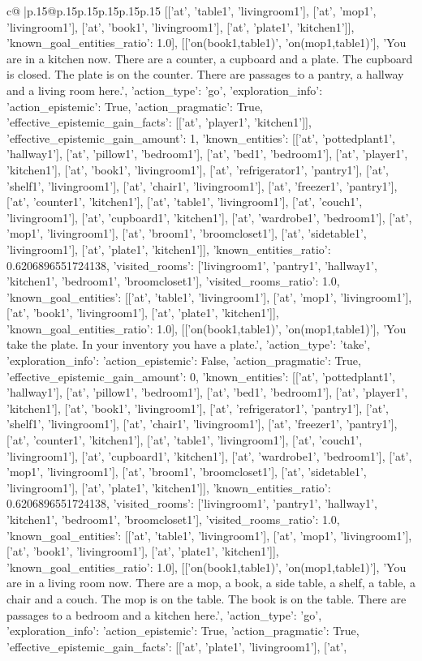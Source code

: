 \documentclass{article}
\begin{document}
{\begin{supertabular}{c@{$\;$}|p{.15\linewidth}@{}p{.15\linewidth}p{.15\linewidth}p{.15\linewidth}p{.15\linewidth}p{.15\linewidth}}
{{{[['at', 'table1', 'livingroom1'], ['at', 'mop1', 'livingroom1'], ['at', 'book1', 'livingroom1'], ['at', 'plate1', 'kitchen1']], 'known_goal_entities_ratio': 1.0}}], [['on(book1,table1)', 'on(mop1,table1)'], 'You are in a kitchen now. There are a counter, a cupboard and a plate. The cupboard is closed. The plate is on the counter. There are passages to a pantry, a hallway and a living room here.', {'action_type': 'go', 'exploration_info': {'action_epistemic': True, 'action_pragmatic': True, 'effective_epistemic_gain_facts': [['at', 'player1', 'kitchen1']], 'effective_epistemic_gain_amount': 1, 'known_entities': [['at', 'pottedplant1', 'hallway1'], ['at', 'pillow1', 'bedroom1'], ['at', 'bed1', 'bedroom1'], ['at', 'player1', 'kitchen1'], ['at', 'book1', 'livingroom1'], ['at', 'refrigerator1', 'pantry1'], ['at', 'shelf1', 'livingroom1'], ['at', 'chair1', 'livingroom1'], ['at', 'freezer1', 'pantry1'], ['at', 'counter1', 'kitchen1'], ['at', 'table1', 'livingroom1'], ['at', 'couch1', 'livingroom1'], ['at', 'cupboard1', 'kitchen1'], ['at', 'wardrobe1', 'bedroom1'], ['at', 'mop1', 'livingroom1'], ['at', 'broom1', 'broomcloset1'], ['at', 'sidetable1', 'livingroom1'], ['at', 'plate1', 'kitchen1']], 'known_entities_ratio': 0.6206896551724138, 'visited_rooms': ['livingroom1', 'pantry1', 'hallway1', 'kitchen1', 'bedroom1', 'broomcloset1'], 'visited_rooms_ratio': 1.0, 'known_goal_entities': [['at', 'table1', 'livingroom1'], ['at', 'mop1', 'livingroom1'], ['at', 'book1', 'livingroom1'], ['at', 'plate1', 'kitchen1']], 'known_goal_entities_ratio': 1.0}}], [['on(book1,table1)', 'on(mop1,table1)'], 'You take the plate. In your inventory you have a plate.', {'action_type': 'take', 'exploration_info': {'action_epistemic': False, 'action_pragmatic': True, 'effective_epistemic_gain_amount': 0, 'known_entities': [['at', 'pottedplant1', 'hallway1'], ['at', 'pillow1', 'bedroom1'], ['at', 'bed1', 'bedroom1'], ['at', 'player1', 'kitchen1'], ['at', 'book1', 'livingroom1'], ['at', 'refrigerator1', 'pantry1'], ['at', 'shelf1', 'livingroom1'], ['at', 'chair1', 'livingroom1'], ['at', 'freezer1', 'pantry1'], ['at', 'counter1', 'kitchen1'], ['at', 'table1', 'livingroom1'], ['at', 'couch1', 'livingroom1'], ['at', 'cupboard1', 'kitchen1'], ['at', 'wardrobe1', 'bedroom1'], ['at', 'mop1', 'livingroom1'], ['at', 'broom1', 'broomcloset1'], ['at', 'sidetable1', 'livingroom1'], ['at', 'plate1', 'kitchen1']], 'known_entities_ratio': 0.6206896551724138, 'visited_rooms': ['livingroom1', 'pantry1', 'hallway1', 'kitchen1', 'bedroom1', 'broomcloset1'], 'visited_rooms_ratio': 1.0, 'known_goal_entities': [['at', 'table1', 'livingroom1'], ['at', 'mop1', 'livingroom1'], ['at', 'book1', 'livingroom1'], ['at', 'plate1', 'kitchen1']], 'known_goal_entities_ratio': 1.0}}], [['on(book1,table1)', 'on(mop1,table1)'], 'You are in a living room now. There are a mop, a book, a side table, a shelf, a table, a chair and a couch. The mop is on the table. The book is on the table. There are passages to a bedroom and a kitchen here.', {'action_type': 'go', 'exploration_info': {'action_epistemic': True, 'action_pragmatic': True, 'effective_epistemic_gain_facts': [['at', 'plate1', 'livingroom1'], ['at', }}}
\end{supertabular}}
\end{document}
